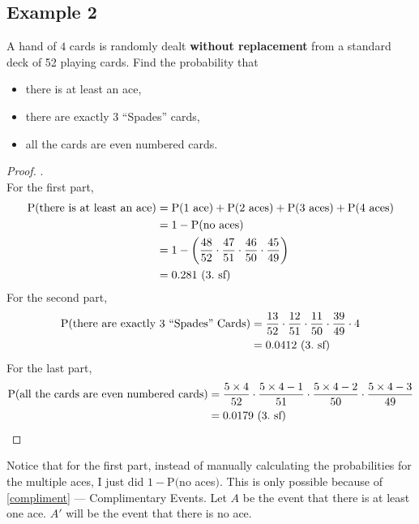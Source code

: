 \documentclass[../setup.tex]{subfiles}
\begin{document}
\subsection{Example 2}
\begin{example}
A hand of $4$ cards is randomly dealt \textbf{without replacement} from a standard deck of 52 playing cards. Find the probability that 
\begin{itemize}
	\item there is at least an ace,
	\item there are exactly 3 ``Spades'' cards,
	\item all the cards are even numbered cards.
\end{itemize}
\end{example}
\begin{proof} . \\
For the first part,
\begin{align*}
\textup{P}(\text{there is at least an ace}) &= \textup{P}(1 \textup{ ace}) + \textup{P}(2 \textup{ aces}) + \textup{P}(3 \textup{ aces}) + \textup{P}(4 \textup{ aces}) \\
&= 1 - \textup{P}(\textup{no aces}) \\
&= 1 - \left(\frac{48}{52}\cdot\frac{47}{51}\cdot\frac{46}{50}\cdot\frac{45}{49}\right) \\
&= 0.281 \ (3. \textup{ sf})
\end{align*}
For the second part,
\begin{align*}
\textup{P}(\text{there are exactly 3 ``Spades'' Cards}) &= \frac{13}{52} \cdot \frac{12}{51} \cdot \frac{11}{50} \cdot \frac{39}{49} \cdot 4 \\
&= 0.0412 \ (3. \textup{ sf})
\end{align*}
For the last part,
\begin{align*}
\textup{P}(\text{all the cards are even numbered cards}) &= \frac{5 \times 4}{52} \cdot \frac{5 \times 4 - 1}{51} \cdot \frac{5 \times 4 - 2}{50} \cdot \frac{5 \times 4 - 3}{49} \\
&= 0.0179 \ (3. \textup{ sf})
\end{align*}
\end{proof}
\begin{remark} Notice that for the first part, instead of manually calculating the probabilities for the multiple aces, I just did $1-$P$($no aces$)$. This is only possible because of \ref{compliment} --- Complimentary Events. Let $A$ be the event that there is at least one ace. $A'$ will be the event that there is no ace.
\end{remark}
\clearpage
\end{document}
